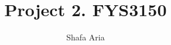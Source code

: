 \documentclass{article}
\begin{document}
\title{Project 2. FYS3150}
\author{Shafa Aria}
\maketitle
\end{document}
